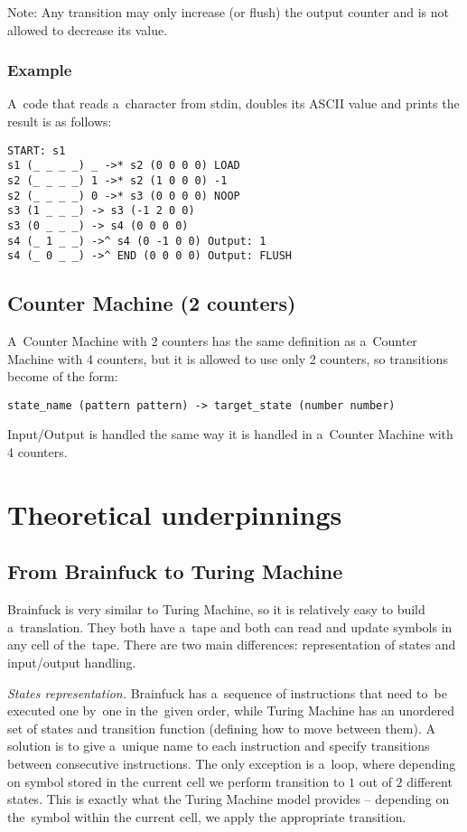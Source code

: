 \documentclass[english,shortabstract,mgr]{iithesis}
\begin{document}
Note: Any transition may only increase (or flush) the output counter
and is not allowed to decrease its value.

\subsection{Example}

A~code that reads a~character from stdin, doubles its ASCII value and prints
the result is as follows:
\begin{verbatim}
START: s1
s1 (_ _ _ _) _ ->* s2 (0 0 0 0) LOAD
s2 (_ _ _ _) 1 ->* s2 (1 0 0 0) -1
s2 (_ _ _ _) 0 ->* s3 (0 0 0 0) NOOP
s3 (1 _ _ _) -> s3 (-1 2 0 0)
s3 (0 _ _ _) -> s4 (0 0 0 0)
s4 (_ 1 _ _) ->^ s4 (0 -1 0 0) Output: 1
s4 (_ 0 _ _) ->^ END (0 0 0 0) Output: FLUSH
\end{verbatim}

\section {Counter Machine (2 counters)}

A~Counter Machine with 2 counters has the same definition as
a~Counter Machine with 4 counters, but it is allowed to use only
2 counters, so transitions become of the form:

\begin{verbatim}
state_name (pattern pattern) -> target_state (number number)
\end{verbatim}

Input/Output is handled the same way it is handled in a~Counter Machine with 4 counters.


\chapter{Theoretical underpinnings}

\section {From Brainfuck to Turing Machine}

Brainfuck is very similar to Turing Machine, so it is relatively easy to build
a~translation. They both have a~tape and both can read and update symbols in any
cell of the~tape. There are two main differences: representation of states and
input/output handling.

\textit{States representation.}
Brainfuck has a~sequence of instructions that need to~be
executed one by~one in the~given order, while Turing Machine has an unordered set
of states and transition function (defining how to move between them). A solution
is to give a~unique name to each instruction and specify transitions between
consecutive instructions. The only exception is a~loop, where depending on
symbol stored in the current cell we perform transition to $1$ out of $2$ different states.
This is exactly what the Turing Machine model provides -- depending on the~symbol
within the current cell, we apply the appropriate transition.
\end{document}
